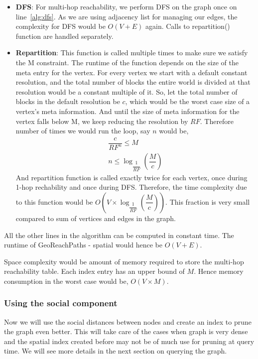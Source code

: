 {\begin{itemize}
  \item \textbf{DFS}: For multi-hop reachability, we perform DFS on the graph once on line~\ref{alg:dfs}. As we are using adjacency list for managing our edges, the complexity for DFS would be $O(V + E)$ again. Calls to repartition() function are handled separately.

  \item \textbf{Repartition}: This function is called multiple times to make sure we satisfy the M constraint. The runtime of the function depends on the size of the meta entry for the vertex. For every vertex we start with a default constant resolution, and the total number of blocks the entire world is divided at that resolution would be a constant multiple of it. So, let the total number of blocks in the default resolution be $c$, which would be the worst case size of a vertex's meta information. And until the size of meta information for the vertex falls below M, we keep reducing the resolution by $RF$. Therefore number of times we would run the loop, say $n$ would be,
  \begin{eqnarray*}
  	\dfrac{c}{RF^n} \leq M\\
  	n \leq {\log_{\dfrac{1}{RF}} (\dfrac{M}{c})}
  \end{eqnarray*}
  And repartition function is called exactly twice for each vertex, once during 1-hop rechability and once during DFS. Therefore, the time complexity due to this function would be $O(V \times {\log_{\dfrac{1}{RF}} (\dfrac{M}{c})})$. This fraction is very small compared to sum of vertices and edges in the graph.
\end{itemize}

All the other lines in the algorithm can be computed in constant time. The runtime of GeoReachPaths - spatial would hence be $O(V + E)$.

Space complexity would be amount of memory required to store the multi-hop reachability table. Each index entry has an upper bound of $M$. Hence memory consumption in the worst case would be, $O(V \times M)$.

\subsubsection{Using the social component}
Now we will use the social distances between nodes and create an index to prune the graph even better. This will take care of the cases when graph is very dense and the spatial index created before may not be of much use for pruning at query time. We will see more details in the next section on querying the graph.

}
